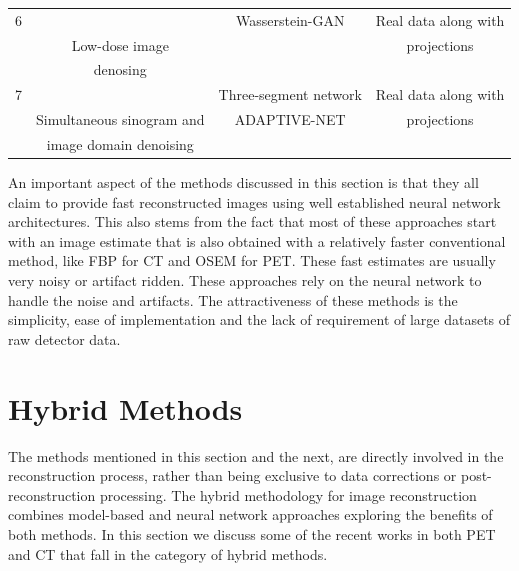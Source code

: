 \begin{table}[ht!]
\begin{tabular}{||c|c|c|c||}
		\hline
		6         & \cite{yang2018low}        &    Wasserstein-GAN & Real data along with            \\ 
		          & Low-dose image            &                    & projections                     \\ 
		          & denosing                  &                    &                                 \\ 
		\hline
		7         & \cite{zhu2020low}         &  Three-segment network  & Real data along with            \\ 
		          & Simultaneous sinogram and &  ADAPTIVE-NET      & projections                     \\ 
	 	          & image domain denoising    &                    &                                 \\ 
		\hline
		
	\end{tabular}
	
\end{table}

An important aspect of the methods discussed in this section is that they all claim to provide fast reconstructed images using well established neural network architectures. This also stems from the fact that most of these approaches start with an image estimate that is also obtained with a relatively faster conventional method, like \ac{FBP} for \ac{CT} and \ac{OSEM} for \ac{PET}. These fast estimates are usually very noisy or artifact ridden. These approaches rely on the neural network to handle the noise and artifacts. The attractiveness of these methods is the simplicity, ease of implementation and the lack of requirement of large datasets of raw detector data. 

\section{Hybrid Methods}

The methods mentioned in this section and the next, are directly involved in the reconstruction process, rather than being exclusive to data corrections or post-reconstruction processing. The hybrid methodology for image reconstruction combines model-based and neural network approaches exploring the benefits of both methods. In this section we discuss some of the recent works in both \ac{PET} and \ac{CT} that fall in the category of hybrid methods.

